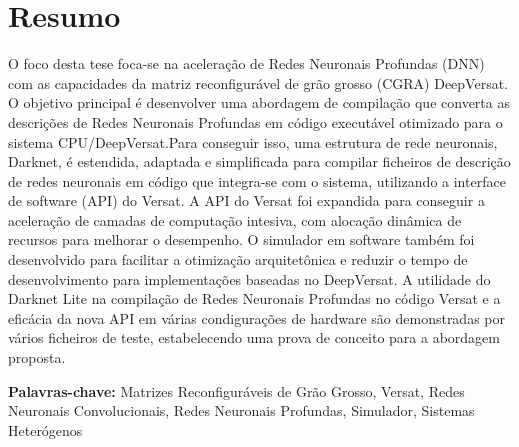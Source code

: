 
\section*{Resumo}



O foco desta tese foca-se na aceleração de Redes Neuronais Profundas (DNN) com as capacidades da matriz reconfigurável de grão grosso (CGRA) DeepVersat.
O objetivo principal é desenvolver uma abordagem de compilação que converta as descrições de Redes Neuronais Profundas em código executável otimizado para o sistema CPU/DeepVersat.Para conseguir isso, uma estrutura de rede neuronais, Darknet, é estendida, adaptada e simplificada para compilar ficheiros de descrição de redes neuronais em código que integra-se com o sistema, utilizando a interface de software (API) do Versat. A API do Versat foi expandida para conseguir a aceleração de camadas de computação intesiva, com alocação dinâmica de recursos para melhorar o desempenho. O simulador em software também foi desenvolvido para facilitar a otimização  arquitetônica e reduzir o tempo de desenvolvimento para implementações baseadas no DeepVersat. A utilidade do Darknet Lite na compilação de Redes Neuronais Profundas no código Versat e a eficácia da nova API em várias condigurações de hardware são demonstradas por vários ficheiros de teste, estabelecendo uma prova de conceito para a abordagem proposta.


\vfill

\textbf{\Large Palavras-chave:} Matrizes Reconfiguráveis de Grão Grosso, Versat, Redes Neuronais Convolucionais, Redes Neuronais Profundas, Simulador, Sistemas Heterógenos

